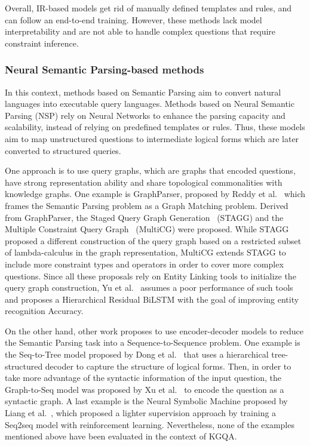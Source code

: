 Overall, IR-based models get rid of manually defined templates and rules, and can follow an 
end-to-end training. However, these methods lack model interpretability and are not able to 
handle complex questions that require constraint inference.

\subsubsection{Neural Semantic Parsing-based methods}
\label{cap2:theoFrame/qakg/approaches/neuSemParsing}
In this context, methods based on Semantic Parsing aim to convert natural languages into 
executable query languages. Methods based on Neural Semantic Parsing (NSP) rely on Neural 
Networks to enhance the parsing capacity and scalability, instead of relying on predefined 
templates or rules. Thus, these models aim to map unstructured questions to intermediate 
logical forms which are later converted to structured queries.

One approach is to use query graphs, which are graphs that encoded questions, have strong 
representation ability and share topological commonalities with knowledge graphs. One example 
is GraphParser, proposed by Reddy et al.~\cite{qa:ReddyLS14} which frames the Semantic Parsing 
problem as a Graph Matching problem. Derived from GraphParser, the Staged Query Graph 
Generation~\cite{qa:YihCHG15} (STAGG) and the Multiple Constraint Query Graph~\cite{qa:BaoDYZZ16} 
(MultiCG) were proposed. While STAGG proposed a different construction of the query graph based 
on a restricted subset of lambda-calculus in the graph representation, MultiCG extends STAGG to 
include more constraint types and operators in order to cover more complex questions. Since all 
these proposals rely on Entity Linking tools to initialize the query graph construction, 
Yu et al.~\cite{qa:YuYHSXZ17} assumes a poor performance of such tools and proposes a 
Hierarchical Residual BiLSTM with the goal of improving entity recognition Accuracy.

On the other hand, other work proposes to use encoder-decoder models to reduce the Semantic 
Parsing task into a Sequence-to-Sequence problem. One example is the Seq-to-Tree model proposed 
by Dong et al.~\cite{nmt:DongL16} that uses a hierarchical tree-structured decoder to capture 
the structure of logical forms. Then, in order to take more advantage of the syntactic 
information of the input question, the Graph-to-Seq model was proposed by Xu et al.~\cite{qa:XuWWYCS18} 
to encode the question as a syntactic graph. A last example is the Neural Symbolic Machine 
proposed by Liang et al.~\cite{qa:LiangBLFL17}, which proposed a lighter supervision approach 
by training a Seq2seq model with reinforcement learning. Nevertheless, none of the examples 
mentioned above have been evaluated in the context of KGQA.

